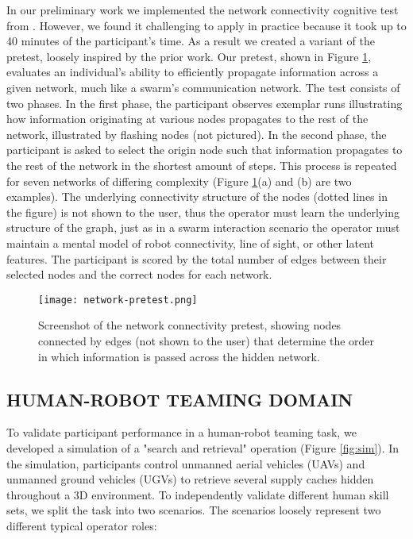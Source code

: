 \documentclass[letterpaper, 10 pt, conference]{ieeeconf}  %
\begin{document}
In our preliminary work we implemented the network connectivity cognitive test from \cite{lynn2020abstract}.  However, we found it challenging to apply in practice because it took up to 40 minutes of the participant's time.  As a result we created a variant of the pretest, loosely inspired by the prior work. Our pretest, shown in Figure \ref{fig:pretest-Net}, evaluates an individual’s ability to efficiently propagate information across a given network, much like a swarm’s communication network. The test consists of two phases.  In the first phase, the participant observes exemplar runs illustrating how information originating at various nodes propagates to the rest of the network, illustrated by flashing nodes (not pictured). In the second phase, the participant is asked to select the origin node such that information propagates to the rest of the network in the shortest amount of steps.  This process is repeated for seven networks of differing complexity (Figure \ref{fig:pretest-Net}(a) and (b) are two examples).  The underlying connectivity structure of the nodes (dotted lines in the figure) is not shown to the user, thus the operator must learn the underlying structure of the graph, just as in a swarm interaction scenario the operator must maintain a mental model of robot connectivity, line of sight, or other latent features.  The participant is scored by the total number of edges between their selected nodes and the correct nodes for each network.

\begin{figure}[h]
  \centering
  \texttt{[image: network-pretest.png]}
  \caption{Screenshot of the network connectivity pretest, showing nodes connected by edges (not shown to the user) that determine the order in which information is passed across the hidden network.  }
  \label{fig:pretest-Net}
\end{figure}

\subsection{HUMAN-ROBOT TEAMING DOMAIN}

To validate participant performance in a human-robot teaming task, we developed a simulation of a "search and retrieval" operation (Figure \ref{fig:sim}). In the simulation, participants control unmanned aerial vehicles (UAVs) and unmanned ground vehicles (UGVs) to retrieve several supply caches hidden throughout a 3D environment. To independently validate different human skill sets, we split the task into two scenarios.  The scenarios loosely represent two different typical operator roles:
\end{document}
